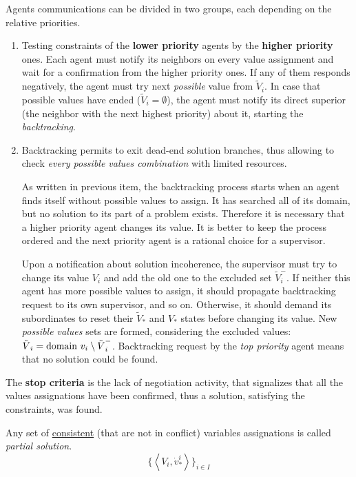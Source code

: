 \documentclass[../header]{subfiles}
\begin{document}
\bigskip\noindent
Agents communications can be divided in two groups, each depending on the relative
priorities.
\begin{enumerate}
  \item Testing constraints of the \textbf{lower priority} agents by the
    \textbf{higher priority} ones.
    Each agent must notify its neighbors on every value assignment and wait
    for a confirmation from the higher priority ones. If any of them responds
    negatively, the agent must try next \emph{possible} value from ${\tilde V}_i$.
    In case that possible values have ended (${\tilde V}_i = \emptyset$), the agent
    must notify its direct superior (the neighbor with the next highest priority)
    about it, starting the \emph{backtracking}.
  \item Backtracking permits to exit dead-end solution branches, thus allowing
    to check \emph{every possible values combination} with limited resources.

    As written in previous item, the backtracking process starts when an agent
    finds itself without possible values to assign. It has searched all of its
    domain, but no solution to its part of a problem exists. Therefore it is
    necessary that a higher priority agent changes its value. It is better to
    keep the process ordered and the next priority agent is a rational choice
    for a supervisor.

    Upon a notification about solution incoherence, the supervisor
    must try to change its value $V_i$ and add the old one to the
    excluded set ${\tilde V}_i^-$.
    If neither this agent has more possible values to assign, it should propagate
    backtracking request to its own supervisor, and so on. Otherwise, it should
    demand its subordinates to reset their ${\tilde V}_*$ and $V_*$ states
    before changing its value. New \emph{possible values} sets are formed, considering
    the excluded values: ${\tilde V}_i = \mathrm{domain}~v_i \setminus {\tilde V}_i^-$.
    Backtracking request by the \emph{top priority} agent means that no solution
    could be found.
\end{enumerate}

\medskip\noindent
The \textbf{stop criteria} is the lack of negotiation activity, that signalizes
that all the values assignations have been confirmed, thus a solution, satisfying
the constraints, was found.

\medskip\noindent
Any set of \underline{consistent} (that are not in conflict)
 variables assignations is called \emph{partial solution}.
$$ \lbrace\left<V_i,{\dot v}^i_*\right>\rbrace_{i \in I} $$
\end{document}
